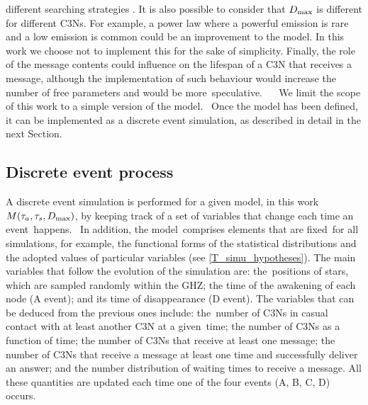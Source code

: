 \documentclass[crop]{CSLB}
\newcommand{\ceti}{C3N}
\newcommand{\cetis}{C3Ns}
\begin{document}
different searching strategies \citep{hippke_interstellar_2017}. 
%
It is also possible to consider that $D_{\rm max}$ is different for different
\cetis{}.
%
For example, a power law where a powerful emission is rare and a low emission
is common could be an improvement to the model.
%
In this work we choose not to implement this for the sake of simplicity.
%
Finally, the role of the message contents could influence on the lifespan of a
\ceti{} that receives a message, although the implementation of such behaviour
would increase the number of free parameters and would be more speculative.   
%
We limit the scope of this work to a simple version of the model. 
%
Once the model has been defined, it can be implemented as a discrete event
simulation, as described in detail in the next Section.


\subsection{Discrete event process}

A discrete event simulation is performed for a given model, in this
work $M(\tau_a, \tau_s,
D_{\rm max})$, by keeping track of a set of variables that change each time an
event happens. 
%
In addition, the model comprises elements that are fixed for all simulations,
for example, the functional forms of the statistical distributions and the
adopted values of particular variables (see \ref{T_simu_hypotheses}).
%
The main variables that follow the evolution of the simulation are:
the positions of stars, which are sampled randomly within the GHZ; the time of
the awakening of each node (A event); and its time of disappearance (D event).
%
The variables that can be deduced from the previous ones include: the number of
\cetis{} in casual contact with at least another \ceti{} at a given time; the
number of \cetis{} as a function of time; the number of \cetis{} that receive at
least one message; the number of \cetis{} that receive a message at
least one time and successfully deliver an answer; and the number distribution
of waiting times to receive a message.
%
All these quantities are updated each time one of the four events (A, B, C, D)
occurs.   

\end{document}
